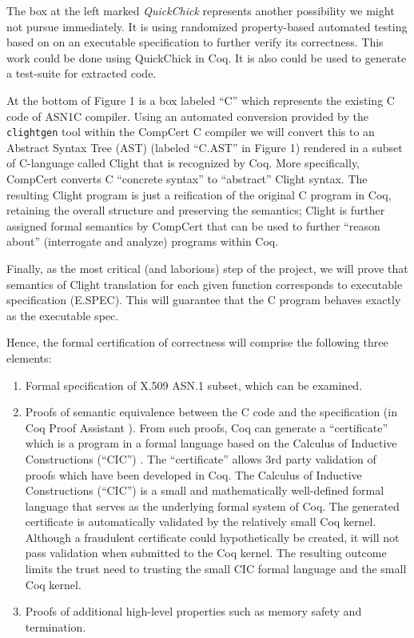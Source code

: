 \documentclass[acmsmall,nonacm]{acmart}
\begin{document}
The box at the left marked \textit{QuickChick} represents another
possibility we might not pursue immediately. It is using randomized
property-based automated testing based on on an executable
specification to further verify its correctness. This work could be
done using QuickChick \cite{QuickChick} in Coq. It is also could be used
to generate a test-suite for extracted code.

At the bottom of Figure 1 is a box labeled ``C'' which represents the
existing C code of ASN1C compiler. Using an automated conversion
provided by the \texttt{clightgen} tool within the CompCert C compiler
\cite{CompCert} we will convert this to an Abstract Syntax Tree (AST)
\cite{AST} (labeled ``C.AST'' in Figure 1) rendered in a subset
of C-language called Clight \cite{Mechanized} that is recognized by Coq. More specifically,
CompCert converts C ``concrete syntax'' to ``abstract'' Clight
syntax. The resulting Clight program is just a reification of the
original C program in Coq, retaining the overall structure and
preserving the semantics; Clight is further assigned formal semantics
by CompCert that can be used to further ``reason about'' (interrogate
and analyze) programs within Coq.

Finally, as the most critical (and laborious) step of the project, we
will prove that semantics of Clight
translation for each given function corresponds to executable
specification (E.SPEC). This will guarantee that the C program behaves exactly
as the executable spec.

Hence, the formal certification of correctness will comprise the following
three elements:

\begin{enumerate}[label=(\alph*)]

\item Formal specification of X.509 ASN.1 subset, which can be examined.

\item Proofs of semantic equivalence between the C code and the
  specification (in Coq Proof Assistant \cite{Coq}). From such
  proofs, Coq can generate a ``certificate'' which is a program in a
  formal language based on the Calculus of Inductive Constructions
  (``CIC'') \cite{CIC}. The ``certificate'' allows 3rd party
  validation of proofs which have been developed in Coq. The Calculus
  of Inductive Constructions (``CIC'') is a small and mathematically
  well-defined formal language that serves as the underlying formal
  system of Coq. The generated certificate is automatically validated
  by the relatively small Coq kernel. Although a fraudulent
  certificate could hypothetically be created, it will not pass
  validation when submitted to the Coq kernel. The resulting outcome
  limits the trust need to trusting the small CIC formal language and
  the small Coq kernel.

\item Proofs of additional high-level properties such as memory safety
  and termination.

\end{enumerate}
  
\end{document}
